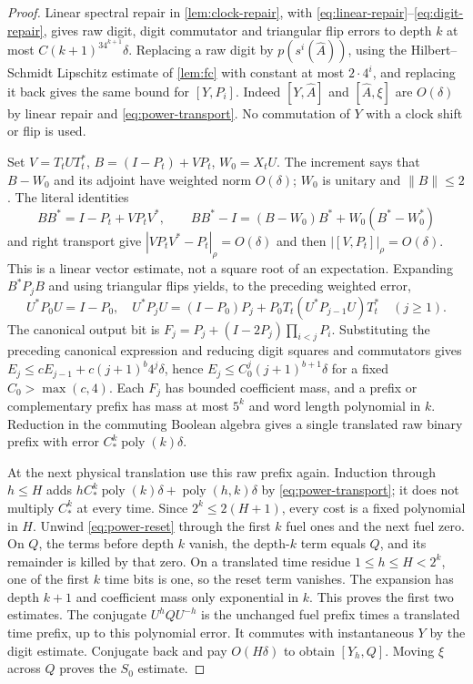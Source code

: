 \begin{proof}
Linear spectral repair in \cref{lem:clock-repair}, with \eqref{eq:linear-repair}--\eqref{eq:digit-repair}, gives raw digit, digit commutator and triangular flip errors to depth $k$ at most $C(k+1)^34^{k+1}\delta$. Replacing a raw digit by $p(s^i(\widehat A))$, using the Hilbert--Schmidt Lipschitz estimate of \cref{lem:fc} with constant at most $2\cdot4^i$, and replacing it back gives the same bound for $[Y,P_i]$. Indeed $[Y,\widehat A]$ and $[\widehat A,\xi]$ are $O(\delta)$ by linear repair and \eqref{eq:power-transport}. No commutation of $Y$ with a clock shift or flip is used.

Set $V=T_tUT_t^*$, $B=(I-P_t)+VP_t$, $W_0=X_tU$. The increment says that $B-W_0$ and its adjoint have weighted norm $O(\delta)$; $W_0$ is unitary and $\|B\|\le2$. The literal identities
\[
 BB^*=I-P_t+VP_tV^*,\qquad
 BB^*-I=(B-W_0)B^*+W_0(B^*-W_0^*)
\]
and right transport give $|VP_tV^*-P_t|_\rho=O(\delta)$ and then $|[V,P_t]|_\rho=O(\delta)$. This is a linear vector estimate, not a square root of an expectation.
Expanding $B^*P_jB$ and using triangular flips yields, to the preceding weighted error,
\[
 U^*P_0U=I-P_0,\quad
 U^*P_jU=(I-P_0)P_j+P_0T_t(U^*P_{j-1}U)T_t^*\quad(j\ge1).
\]
The canonical output bit is $F_j=P_j+(I-2P_j)\prod_{i<j}P_i$. Substituting the preceding canonical expression and reducing digit squares and commutators gives
$E_j\le cE_{j-1}+c(j+1)^b4^j\delta$, hence $E_j\le C_0^j(j+1)^{b+1}\delta$ for a fixed $C_0>\max(c,4)$.
Each $F_j$ has bounded coefficient mass, and a prefix or complementary prefix has mass at most $5^k$ and word length polynomial in $k$. Reduction in the commuting Boolean algebra gives a single translated raw binary prefix with error $C_*^k\operatorname{poly}(k)\delta$.

At the next physical translation use this raw prefix again. Induction through $h\le H$ adds $hC_*^k\operatorname{poly}(k)\delta+\operatorname{poly}(h,k)\delta$ by \eqref{eq:power-transport}; it does not multiply $C_*^k$ at every time. Since $2^k\le2(H+1)$, every cost is a fixed polynomial in $H$.
Unwind \eqref{eq:power-reset} through the first $k$ fuel ones and the next fuel zero. On $Q$, the terms before depth $k$ vanish, the depth-$k$ term equals $Q$, and its remainder is killed by that zero. On a translated time residue $1\le h\le H<2^k$, one of the first $k$ time bits is one, so the reset term vanishes. The expansion has depth $k+1$ and coefficient mass only exponential in $k$. This proves the first two estimates.
The conjugate $U^hQU^{-h}$ is the unchanged fuel prefix times a translated time prefix, up to this polynomial error. It commutes with instantaneous $Y$ by the digit estimate. Conjugate back and pay $O(H\delta)$ to obtain $[Y_h,Q]$. Moving $\xi$ across $Q$ proves the $S_0$ estimate.


\end{proof}

